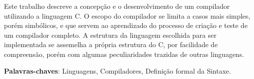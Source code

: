 Este trabalho descreve a concepção e o desenvolvimento de um compilador utilizando a linguagem C. O escopo do compilador se limita a casos mais simples, porém simbólicos, e que servem ao aprendizado do processo de criação e teste de um compilador completo. A estrutura da linguagem escolhida para ser implementada se assemelha a própria estrutura do C, por facilidade de compreensão, porém com algumas peculiaridades trazidas de outras linguagens.

\vspace{\onelineskip}
    
\noindent
\textbf{Palavras-chaves}: Linguagens, Compiladores, Definição formal da Sintaxe.
